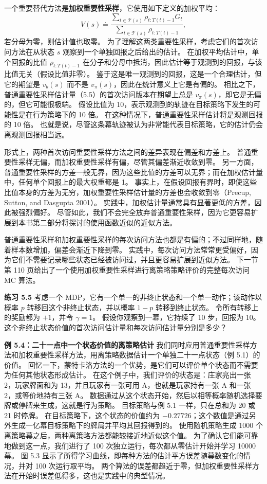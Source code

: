 \documentclass[UTF8,12pt,a4paper,fontset=fandol]{ctexart}
\begin{document}
一个重要替代方法是\textbf{加权重要性采样}，它使用如下定义的加权平均：
\begin{equation}
V(s)\doteq
\frac{\sum_{t\in\mathcal{T}(s)}\rho_{t:T(t)-1}G_t}
{\sum_{t\in\mathcal{T}(s)}\rho_{t:T(t)-1}},
\end{equation}
若分母为零，则估计值也取零。
为了理解这两类重要性采样，考虑它们的首次访问方法在从状态 $s$ 观察到一个单独回报之后给出的估计。
在加权平均估计中，单个回报的比值 $\rho_{t:T(t)-1}$ 在分子和分母中抵消，因此估计等于观测到的回报，与该比值无关（假设比值非零）。
鉴于这是唯一观测到的回报，这是一个合理估计，但它的期望是 $v_b(s)$ 而不是 $v_\pi(s)$，因此在统计意义上它是有偏的。
相比之下，普通重要性采样估计量（5.5）的首次访问版本在期望上总是 $v_\pi(s)$，即它是无偏的，但它可能很极端。
假设比值为 10，表示观测到的轨迹在目标策略下发生的可能性是在行为策略下的 10 倍。
在这种情况下，普通重要性采样估计将是观测回报的 10 倍。
也就是说，尽管这条幕轨迹被认为非常能代表目标策略，它的估计仍会离观测回报相当远。

形式上，两种首次访问重要性采样方法之间的差异表现在偏差和方差上。
普通重要性采样无偏，而加权重要性采样有偏，尽管其偏差渐近收敛到零。
另一方面，普通重要性采样的方差一般无界，因为这些比值的方差可以无界；而在加权估计量中，任何单个回报上的最大权重都是 1。
事实上，在假设回报有界时，即使这些比值本身的方差为无穷，加权重要性采样估计量的方差也会收敛到零（Precup, Sutton, and Dasgupta 2001）。
实践中，加权估计量通常具有显著更低的方差，因此被强烈偏好。
尽管如此，我们不会完全放弃普通重要性采样，因为它更容易扩展到本书第二部分将探讨的使用函数近似的近似方法。

普通重要性采样和加权重要性采样的每次访问方法也都是有偏的；不过同样地，随着样本数增加，偏差会渐近下降到零。
实践中，每次访问方法常常更受偏好，因为它们不需要记录哪些状态已经被访问过，并且更容易扩展到近似方法。
下一节第 110 页给出了一个使用加权重要性采样进行离策略策略评价的完整每次访问 MC 算法。

\noindent\textbf{练习 5.5}
考虑一个 MDP，它有一个单一的非终止状态和一个单一动作；该动作以概率 $p$ 转移回这个非终止状态，并以概率 $1-p$ 转移到终止状态。
令所有转移上的奖励都为 $+1$，并令 $\gamma=1$。
假设你观察到一幕，它持续了 10 步，回报为 10。
这个非终止状态价值的首次访问估计量和每次访问估计量分别是多少？

\noindent\textbf{例 5.4：二十一点中一个状态价值的离策略估计}
我们同时应用普通重要性采样方法和加权重要性采样方法，用离策略数据估计一个单独二十一点状态（例 5.1）的价值。
回忆一下，蒙特卡洛方法的一个优势，是它们可以评价单个状态而不需要为任何其他状态形成估计。
在这个例子中，我们评价的状态是：庄家亮出一张 2，玩家牌面和为 13，并且玩家有一张可用 A，也就是玩家持有一张 A 和一张 2，或等价地持有三张 A。
数据通过从这个状态开始，然后以相等概率随机选择要牌或停牌来生成，这就是行为策略。
目标策略与例 5.1 一样，只在总和为 20 或 21 时停牌。
在目标策略下，这个状态的价值约为 $-0.27726$；这个数值是通过另外生成一亿幕目标策略下的牌局并平均其回报得到的。
使用随机策略生成 1000 个离策略幕之后，两种离策略方法都能较接近地近似这个值。
为了确认它们能可靠地做到这一点，我们进行了 100 次独立运行，每次都从零估计开始并学习 10000 幕。
图 5.3 显示了所得学习曲线，即每种方法的估计平方误差随幕数变化的情况，并对 100 次运行取平均。
两个算法的误差都趋近于零，但加权重要性采样方法在开始时误差低得多，这也是实践中的典型情况。
\end{document}
